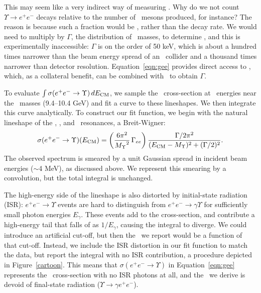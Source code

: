 \documentclass{cornell}
\begin{document}
This may seem like a very indirect way of measuring \gee.  Why do we
not count $\Upsilon \to e^+e^-$ decays relative to the number of \ups\
mesons produced, for instance?  The reason is because such a fraction
would be \bee, rather than the decay rate.  We would need to multiply
by $\Gamma$, the distribution of \ups\ masses, to determine \gee, and
this is experimentally inaccessible: $\Gamma$ is on the order of 50
keV, which is about a hundred times narrower than the beam energy
spread of an \ee\ collider and a thousand times narrower than detector
resolution.  Equation~\ref{eqn:gee} provides direct access to \gee,
which, as a collateral benefit, can be combined with \bee\ to obtain
$\Gamma$.

To evaluate $\int \sigma(e^+e^- \to \Upsilon) \, dE_{\mbox{\scriptsize CM}}$, we
sample the \ups\ cross-section at \ee\ energies near the \ups\ masses
(9.4--10.4 GeV) and fit a curve to these lineshapes.  We then
integrate this curve analytically.  To construct our fit function, we
begin with the natural lineshape of the \us, \uss, and \usss\
resonances, a Breit-Wigner:
\begin{equation}
  \sigma(e^+e^- \to \Upsilon)(E_{\mbox{\scriptsize CM}}) = \left(
  \frac{6\pi^2}{{M_\Upsilon}^2} \, \Gamma_{ee} \right)
  \frac{\Gamma/2\pi^2}{(E_{\mbox{\scriptsize CM}} - M_\Upsilon)^2 + (\Gamma/2)^2} \mbox{.}
  \label{eqn:breitwigner}
\end{equation}
The observed spectrum is smeared by a unit Gaussian spread in incident
beam energies ($\sim$4 MeV), as discussed above.  We represent this
smearing by a convolution, but the total integral is unchanged.

The high-energy side of the lineshape is also distorted by
initial-state radiation (ISR): $e^+e^- \to \Upsilon$ events are hard
to distinguish from $e^+e^- \to \gamma \Upsilon$ for sufficiently
small photon energies $E_\gamma$.  These events add to the
cross-section, and contribute a high-energy tail that falls of as
$1/E_\gamma$, causing the integral to diverge.  We could introduce an
artificial cut-off, but then the \gee\ we report would be a function
of that cut-off.  Instead, we include the ISR distortion in our fit
function to match the data, but report the integral with no ISR
contribution, a procedure depicted in Figure~\ref{cartoon}.  This
means that $\sigma(e^+e^- \to \Upsilon)$ in Equation~\ref{eqn:gee}
represents the \ups\ cross-section with no ISR photons at all, and the
\gee\ we derive is devoid of final-state radiation ($\Upsilon \to
\gamma e^+e^-$).
\end{document}
